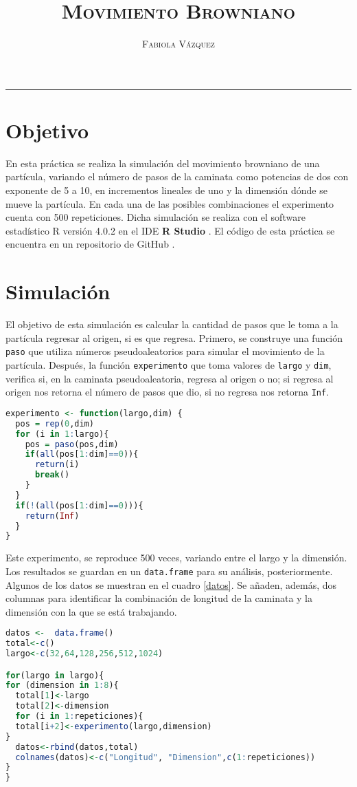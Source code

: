 \documentclass[12pt,letterpaper]{article}
\title{\textsc{Movimiento Browniano}}
\author{\textsc{Fabiola Vázquez}}
\begin{document}
\maketitle
\hrule
\section{Objetivo}

En esta práctica \cite{elisa} se realiza la simulación del movimiento browniano de una partícula, variando el número de pasos de la caminata como potencias de dos con exponente de 5 a 10, en incrementos lineales de uno y la dimensión dónde se mueve la partícula. En cada una de las posibles combinaciones el experimento cuenta con 500 repeticiones. Dicha simulación se realiza con el software estadístico R\cite{R} versión 4.0.2  en el IDE \textbf{R Studio} \cite{rstudio} .  El código de esta práctica se encuentra en un repositorio de GitHub \cite{Fabiola}.

\section{Simulación}
El objetivo de esta simulación es calcular la cantidad de pasos que le toma a la partícula regresar al origen, si es que regresa. Primero, se construye una función \texttt{paso} que utiliza números pseudoaleatorios para simular el movimiento de la partícula. Después, la función \texttt{experimento} que toma valores de \texttt{largo} y \texttt{dim}, verifica si, en la caminata pseudoaleatoria, regresa al origen o no; si regresa al origen nos retorna el número de pasos que dio, si no regresa nos retorna \texttt{Inf}. 

\begin{lstlisting}[language=R]
experimento <- function(largo,dim) {
  pos = rep(0,dim)
  for (i in 1:largo){
    pos = paso(pos,dim)
    if(all(pos[1:dim]==0)){
      return(i)
      break()
    }
  }
  if(!(all(pos[1:dim]==0))){
    return(Inf)
  }
}
\end{lstlisting}
Este experimento, se reproduce 500 veces, variando entre el largo y la dimensión. Los resultados se guardan en un \texttt{data.frame} para su análisis, posteriormente. Algunos de los datos se muestran en el cuadro \ref{datos}. Se añaden, además, dos columnas para identificar la combinación  de longitud de la caminata y la dimensión con la que se está trabajando.
\begin{lstlisting}[language=R]
datos <-  data.frame()
total<-c()
largo<-c(32,64,128,256,512,1024)

for(largo in largo){
for (dimension in 1:8){
  total[1]<-largo
  total[2]<-dimension
  for (i in 1:repeticiones){
  total[i+2]<-experimento(largo,dimension)
}
  datos<-rbind(datos,total)
  colnames(datos)<-c("Longitud", "Dimension",c(1:repeticiones))
}
}
\end{lstlisting}
\end{document}
